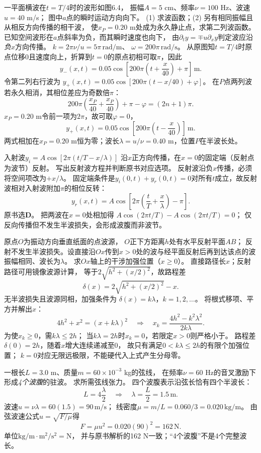 \problemtext 一平面横波在$t=T/4$时的波形如图6.4，
振幅$A=5$ cm、频率$\nu=100$ Hz、波速$u=40$ m/s；
图中$a$点的瞬时运动方向向下。
(1) 求波函数；(2) 另有相同振幅且从相反方向传播的相干波，
使$x_P=0.20$ m处成为永久静止点，求第二列波函数。
\workings
已知空间波形在$a$点斜率为负，而其瞬时速度也向下，
由$\partial_t y=\mp u\partial_x y$判定波应沿\emph{负}$x$方向传播。
$k=2\pi\nu/u=5\pi\,\mathrm{rad/m}$、
$\omega=200\pi\,\mathrm{rad/s}$。
从原图知$t=T/4$时原点位移0且速度向上，折算到$t=0$的原点初相可取$\pi$，因此
\[
\boxed{y_-(x,t)=0.05\cos\left[
200\pi\left(t+\frac{x}{40}\right)+\pi\right]\,\mathrm m}.
\]
令第二列右行波为
$y_+(x,t)=0.05\cos[200\pi(t-x/40)+\varphi]$。
在$P$点两列波若永久相消，其相位差应为奇数倍$\pi$：
\[
200\pi\left(\frac{x_P}{40}+\frac{x_P}{40}\right)
+\pi-\varphi=(2n+1)\pi.
\]
$x_P=0.20$ m令前一项为$2\pi$，故可取$\varphi=0$，
\[
\boxed{y_+(x,t)=0.05\cos\left[
200\pi\left(t-\frac{x}{40}\right)\right]\,\mathrm m}.
\]
\crosscheck 两式相加在$x_P=0.20$ m恒为零；波长$\lambda=u/\nu=0.40$ m，位置$P$在半波长处。

\problemtext 入射波$y_i=A\cos[2\pi(t/T-x/\lambda)]$
沿$x$正方向传播，在$x=0$的固定端（反射点为波节）反射。
写出反射波方程并判断原书对应选项。
\workings
反射波沿负$x$传播，必须将空间项改为$+x/\lambda$。
固定端条件是$y_i(0,t)+y_r(0,t)=0$对所有$t$成立，故反射波相对入射波附加$\pi$的相位反转：
\[
\boxed{y_r(x,t)=A\cos\left[
2\pi\left(\frac tT+\frac{x}{\lambda}\right)-\pi\right]}.
\]
原书选\textbf{D}。
\crosscheck 把两波在$x=0$处相加得
$A\cos(2\pi t/T)-A\cos(2\pi t/T)=0$；
仅反向传播但不发生半波损失，会形成波腹而非波节。

\problemtext 原点$O$为振动方向垂直纸面的点波源，
$O$正下方距离$h$处有水平反射平面$AB$；
反射不发生半波损失。设直接沿$Ox$传到$x>0$处的波与经平面反射后再到达该点的波振幅相同、波长为$\lambda$。
求$Ox$轴上的干涉加强位置（$x\ge0$）。
\workings
直接路径长$x$；反射路径可用镜像波源计算，
等于$2\sqrt{h^2+(x/2)^2}$，故路程差
\[
\delta(x)=2\sqrt{h^2+(x/2)^2}-x.
\]
无半波损失且波源同相，加强条件为
$\delta(x)=k\lambda$，$k=1,2,\ldots$。
将根式移项、平方并解出$x$：
\[
4h^2+x^2=(x+k\lambda)^2
\quad\Longrightarrow\quad
\boxed{x_k=\frac{4h^2-k^2\lambda^2}{2k\lambda}}.
\]
为使$x_k\ge0$，需$k\lambda\le2h$；
当$k\lambda=2h$时$x_k=0$，若限定$x>0$则严格小于。
\crosscheck 路程差$\delta(0)=2h$，随着$x$增大连续递减至0，
故只有满足$0<k\lambda\le2h$的有限个加强位置；
$k=0$对应无限远极限，不能硬代入上式产生分母零。

\problemtext 一根长$L=3.0$ m、质量$m=60\times10^{-3}$ kg的弦线，
在频率$\nu=60$ Hz的音叉激励下形成\emph{4个波腹}的驻波。
求所需弦线张力。
\workings
四个波腹表示沿弦长恰有四个半波长：
\[
L=4\frac{\lambda}{2}
\quad\Longrightarrow\quad
\boxed{\lambda=\frac L2=1.5\,\mathrm m}.
\]
波速$u=\nu\lambda=60(1.5)=90\,\mathrm{m/s}$；
线密度$\mu=m/L=0.060/3=0.020\,\mathrm{kg/m}$。
由弦波速公式$u=\sqrt{F/\mu}$得
\[
\boxed{F=\mu u^2=0.020(90)^2=162\,\mathrm N}.
\]
\crosscheck 单位$\mathrm{kg/m}\cdot\mathrm{m^2/s^2}=\mathrm N$，
并与原书解析的162 N一致；“4个波腹”不是4个完整波长。
